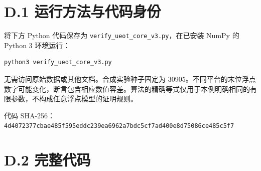 \documentclass[
  11pt,
  oneside]{book}
\begin{document}
\section{D.1 运行方法与代码身份}\label{d.1-ux8fd0ux884cux65b9ux6cd5ux4e0eux4ee3ux7801ux8eabux4efd}

将下方 Python 代码保存为 \nolinkurl{verify_ueot_core_v3.py}，在已安装 NumPy 的 Python 3 环境运行：

\begin{verbatim}
python3 verify_ueot_core_v3.py
\end{verbatim}

无需访问原始数据或其他文档。合成实验种子固定为 30905。不同平台的末位浮点数字可能变化，断言包含相应数值容差。算法的精确等式仅用于本例明确相同的有限参数，不构成任意浮点模型的证明规则。

代码 SHA-256：\nolinkurl{4d4072377cbae485f595eddc239ea6962a7bdc5cf7ad400e8d75086ce485c5f7}

\section{D.2 完整代码}\label{d.2-ux5b8cux6574ux4ee3ux7801}
\end{document}
